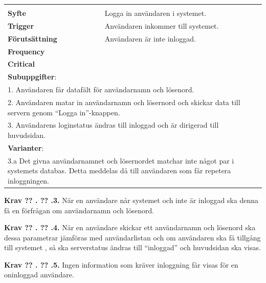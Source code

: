 \documentclass[a4paper]{article}
\newcommand\getcurrentref[1]{%
 \ifnumequal{\value{#1}}{0}
  {??}
  {\the\value{#1}}%
}
\newcommand\requirement[2]{
	\numberedrow{Krav}{#1}{#2}
}
\newcommand\scenario[2] {
	\numberedrow{Scenario}{#1}{#2}
}
\newcommand\numberedrow[3]{
	\noindent
	\textbf{#1 \getcurrentref{section}.\getcurrentref{subsection}.#2.} #3
	
}
\begin{document}
\begin{table}[htbp]
\begin{tabular}{ | p{2cm} p{11cm} | }
   
        \hline
	\multicolumn{2}{|p{13cm}|}{ \indent\scenario{1}} \\
    \textbf{Syfte} & Logga in användaren i systemet.\\
    \textbf{Trigger} & Användaren inkommer till systemet. \\
    \textbf{Förutsättning} & Användaren är inte inloggad.\\
    \textbf{Frequency} & \\
    \textbf{Critical} & \\
    \hline

	\multicolumn{2}{|p{13cm}|}{ \textbf{Subuppgifter}:} \\

	\multicolumn{2}{|p{13cm}|}{ 1. Användaren får datafält för användarnamn och lösenord.}\\
	\multicolumn{2}{|p{13cm}|}{ 2. Användaren matar in användarnamn och lösernord och skickar data till servern genom ``Logga in''-knappen.} \\	
	\multicolumn{2}{|p{13cm}|}{ 3. Användarens loginstatus ändras till inloggad och är dirigerad till huvudsidan. }\\ \hline
    \multicolumn{2}{|p{13cm}|}{ \textbf{Varianter}: }\\
	\multicolumn{2}{|p{13cm}|}{ 3.a Det givna användarnamnet och lösernordet matchar inte något par i systemets databas. Detta meddelas då till användaren som får repetera inloggningen.}\\
	    \hline


\end{tabular}
\end{table}

\requirement{3}{När en användare når systemet och inte är inloggad ska denna få en förfrågan om användarnamn och lösenord.}
\requirement{4}{När en användare skickar ett användarnamn och lösenord ska dessa parametrar jämföras med användarlistan och om användaren ska få tillgång till systemet , så ska serverstatus ändras till ``inloggad'' och huvudsidan ska visas.}
\requirement{5}{Ingen information som kräver inloggning får visas för en oninloggad användare.}
\end{document}
